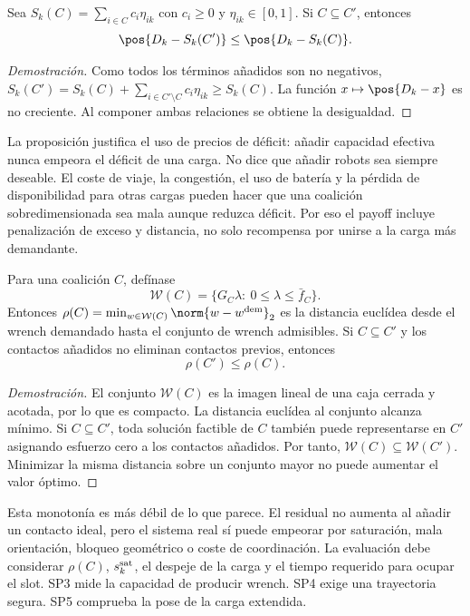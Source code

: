 \begin{proposicion}
Sea $S_k(C)=\sum_{i\in C}c_i\eta_{ik}$ con $c_i\geq 0$ y
$\eta_{ik}\in[0,1]$. Si $C\subseteq C'$, entonces
\[
  \pos{D_k-S_k(C')}\leq \pos{D_k-S_k(C)} .
\]
\end{proposicion}

\begin{proof}[Demostración]
Como todos los términos añadidos son no negativos,
$S_k(C')=S_k(C)+\sum_{i\in C'\setminus C}c_i\eta_{ik}\geq S_k(C)$. La función
$x\mapsto\pos{D_k-x}$ es no creciente. Al componer ambas relaciones se obtiene la
desigualdad.
\end{proof}

La proposición justifica el uso de precios de déficit: añadir capacidad efectiva nunca
empeora el déficit de una carga. No dice que añadir robots sea siempre deseable. El coste
de viaje, la congestión, el uso de batería y la pérdida de disponibilidad para otras
cargas pueden hacer que una coalición sobredimensionada sea mala aunque reduzca déficit.
Por eso el payoff incluye penalización de exceso y distancia, no solo recompensa por
unirse a la carga más demandante.

\begin{proposicion}
Para una coalición $C$, defínase
\[
  \mathcal W(C)=\{G_C\lambda:\ 0\leq\lambda\leq\bar f_C\}.
\]
Entonces $\rho(C)=\min_{w\in\mathcal W(C)}\norm{w-w^{\rm dem}}_2$ es la distancia
euclídea desde el wrench demandado hasta el conjunto de wrench admisibles. Si
$C\subseteq C'$ y los contactos añadidos no eliminan contactos previos, entonces
\[
  \rho(C')\leq \rho(C).
\]
\end{proposicion}

\begin{proof}[Demostración]
El conjunto $\mathcal W(C)$ es la imagen lineal de una caja cerrada y acotada, por lo que
es compacto. La distancia euclídea al conjunto alcanza mínimo. Si $C\subseteq C'$, toda
solución factible de $C$ también puede representarse en $C'$ asignando esfuerzo cero a
los contactos añadidos. Por tanto, $\mathcal W(C)\subseteq\mathcal W(C')$. Minimizar la
misma distancia sobre un conjunto mayor no puede aumentar el valor óptimo.
\end{proof}

Esta monotonía es más débil de lo que parece. El residual no aumenta al añadir un contacto
ideal, pero el sistema real sí puede empeorar por saturación, mala orientación, bloqueo
geométrico o coste de coordinación. La evaluación debe considerar $\rho(C)$,
$s_k^{\rm sat}$, el despeje de la carga y el tiempo requerido para ocupar el slot. SP3
mide la capacidad de producir wrench. SP4 exige una trayectoria segura. SP5 comprueba
la pose de la carga extendida.

